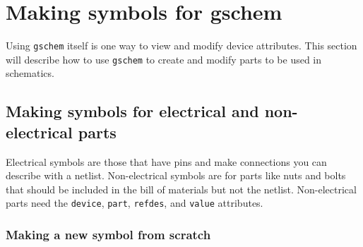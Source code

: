\section{Making symbols for gschem}
Using \texttt{gschem} itself is one way to view and modify device attributes.  This section will describe how to use \texttt{gschem} to create and modify parts to be used in schematics. 


\subsection{Making symbols for electrical and non-electrical parts}
Electrical symbols are those that have pins and make connections you can describe with a netlist.  Non-electrical symbols are for parts like nuts and bolts that should be included in the bill of materials but not the netlist.  Non-electrical parts need the \texttt{device}, \texttt{part}, \texttt{refdes}, and \texttt{value} attributes.

\subsubsection{Making a new symbol from scratch}

